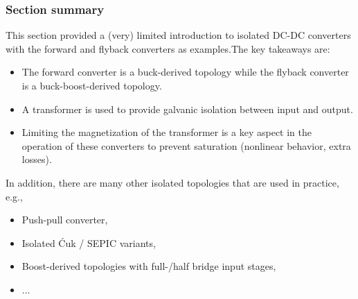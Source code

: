 \begin{frame}
	\frametitle{Section summary}
	This section provided a (very) limited introduction to isolated DC-DC converters with the forward and flyback converters as examples.\pause The key takeaways are:
	\begin{itemize}
		\item The forward converter is a buck-derived topology while the flyback converter is a buck-boost-derived topology.\pause
		\item A transformer is used to provide galvanic isolation between input and output.\pause
		\item Limiting the magnetization of the transformer is a key aspect in the operation of these converters to prevent saturation (nonlinear behavior, extra losses).
	\end{itemize}\pause
	In addition, there are many other isolated topologies that are used in practice, e.g.,
	\begin{itemize}
		\item Push-pull converter,
		\item Isolated Ćuk / SEPIC variants,
		\item Boost-derived topologies with full-/half bridge input stages,
		\item ...
	\end{itemize}
\end{frame}